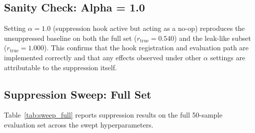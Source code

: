 \documentclass[12pt, a4paper]{article}
\begin{document}
\subsection{Sanity Check: Alpha = 1.0}

Setting $\alpha = 1.0$ (suppression hook active but acting as a no-op) reproduces the
unsuppressed baseline on both the full set ($r_{\text{true}} = 0.540$) and the
leak-like subset ($r_{\text{true}} = 1.000$).
This confirms that the hook registration and evaluation path are implemented correctly
and that any effects observed under other $\alpha$ settings are attributable to the
suppression itself.

\subsection{Suppression Sweep: Full Set}

Table~\ref{tab:sweep_full} reports suppression results on the full 50-sample evaluation
set across the swept hyperparameters.
\end{document}
